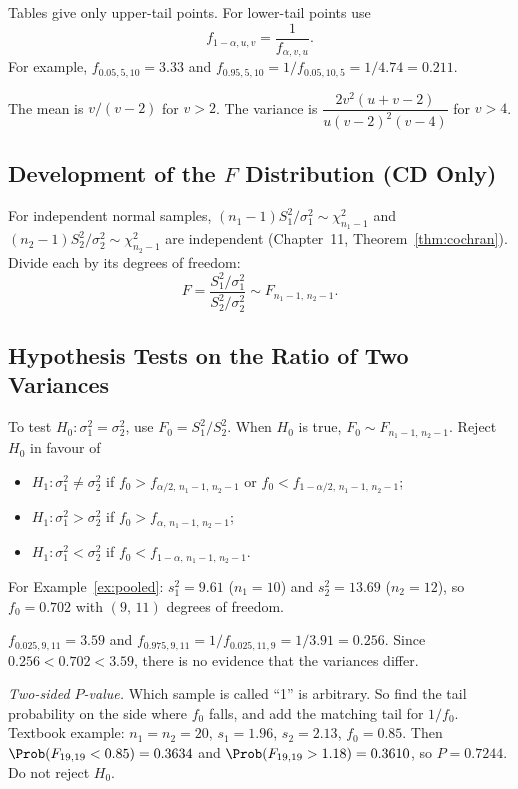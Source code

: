 Tables give only upper-tail points. For lower-tail points use
\[ f_{1-\alpha,u,v}=\frac1{f_{\alpha,v,u}}. \]
For example, $f_{0.05,5,10}=3.33$ and $f_{0.95,5,10}=1/f_{0.05,10,5}=1/4.74=0.211$.

The mean is $v/(v-2)$ for $v>2$. The variance is $\dfrac{2v^2(u+v-2)}{u(v-2)^2(v-4)}$ for $v>4$.

\subsection{Development of the $F$ Distribution (CD Only)}

For independent normal samples, $(n_1-1)S_1^2/\sigma_1^2\sim\chi^2_{n_1-1}$ and $(n_2-1)S_2^2/\sigma_2^2\sim\chi^2_{n_2-1}$ are independent (Chapter~11, Theorem~\ref{thm:cochran}). Divide each by its degrees of freedom:
\[ F=\frac{S_1^2/\sigma_1^2}{S_2^2/\sigma_2^2}\sim F_{n_1-1,\,n_2-1}. \]

\subsection{Hypothesis Tests on the Ratio of Two Variances}

\begin{theorem}\label{thm:ftest}
To test $H_0:\sigma_1^2=\sigma_2^2$, use $F_0=S_1^2/S_2^2$. When $H_0$ is true, $F_0\sim F_{n_1-1,\,n_2-1}$. Reject $H_0$ in favour of
\begin{itemize}
  \item $H_1:\sigma_1^2\ne\sigma_2^2$ if $f_0>f_{\alpha/2,\,n_1-1,\,n_2-1}$ or $f_0<f_{1-\alpha/2,\,n_1-1,\,n_2-1}$;
  \item $H_1:\sigma_1^2>\sigma_2^2$ if $f_0>f_{\alpha,\,n_1-1,\,n_2-1}$;
  \item $H_1:\sigma_1^2<\sigma_2^2$ if $f_0<f_{1-\alpha,\,n_1-1,\,n_2-1}$.
\end{itemize}
\end{theorem}

\begin{example}
For Example~\ref{ex:pooled}: $s_1^2=9.61$ ($n_1=10$) and $s_2^2=13.69$ ($n_2=12$), so $f_0=0.702$ with $(9,\,11)$ degrees of freedom.

$f_{0.025,9,11}=3.59$ and $f_{0.975,9,11}=1/f_{0.025,11,9}=1/3.91=0.256$. Since $0.256<0.702<3.59$, there is no evidence that the variances differ.

\emph{Two-sided $P$-value.} Which sample is called ``1'' is arbitrary. So find the tail probability on the side where $f_0$ falls, and add the matching tail for $1/f_0$. Textbook example: $n_1=n_2=20$, $s_1=1.96$, $s_2=2.13$, $f_0=0.85$. Then $\Prob(F_{19,19}<0.85)=0.3634$ and $\Prob(F_{19,19}>1.18)=0.3610$, so $P=0.7244$. Do not reject $H_0$.
\end{example}

